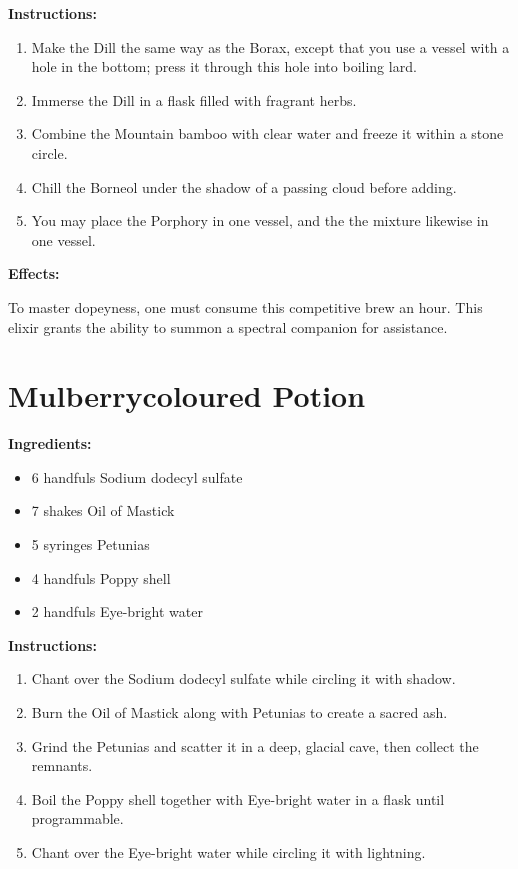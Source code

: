 \documentclass{article}
\begin{document}
\textbf{Instructions:}

\begin{enumerate}
  \item Make the Dill the same way as the Borax, except that you use a vessel with a hole in the bottom; press it through this hole into boiling lard.
  \item Immerse the Dill in a flask filled with fragrant herbs.
  \item Combine the Mountain bamboo with clear water and freeze it within a stone circle.
  \item Chill the Borneol under the shadow of a passing cloud before adding.
  \item You may place the Porphory in one vessel, and the the mixture likewise in one vessel.
\end{enumerate}

\textbf{Effects:}

To master dopeyness, one must consume this competitive brew an hour. This elixir grants the ability to summon a spectral companion for assistance.

\newpage
\section*{Mulberrycoloured Potion}

\textbf{Ingredients:}

\begin{itemize}
  \item 6 handfuls Sodium dodecyl sulfate
  \item 7 shakes Oil of Mastick
  \item 5 syringes Petunias
  \item 4 handfuls Poppy shell
  \item 2 handfuls Eye-bright water
\end{itemize}

\textbf{Instructions:}

\begin{enumerate}
  \item Chant over the Sodium dodecyl sulfate while circling it with shadow.
  \item Burn the Oil of Mastick along with Petunias to create a sacred ash.
  \item Grind the Petunias and scatter it in a deep, glacial cave, then collect the remnants.
  \item Boil the Poppy shell together with Eye-bright water in a flask until programmable.
  \item Chant over the Eye-bright water while circling it with lightning.
\end{enumerate}
\end{document}

